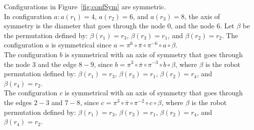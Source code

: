 \begin{example}
\label{ex:confSym}
Configurations in Figure~\ref{fig:confSym} are symmetric.\\
In configuration $a: a(r_1)=4$, $a(r_2)=6$, and $a(r_3)=8$, the axis of symmetry is the diameter that 
goes through the node $0$, and the node $6$. 
Let $\beta$ be the permutation defined by: $\beta(r_1) = r_3$, $\beta(r_3)=r_1$, and $\beta(r_2)=r_2$. 
The configuration $a$ is symmetrical since $a= \pi^6 \circ \overline{\pi} \circ \pi^{-6} \circ a \circ \beta$.\\
The configuration $b$ is symmetrical with an axis of symmetry that goes through the node $3$ and the edge $8-9$,
since $b = \pi^3 \circ \overline{\pi} \circ \pi^{-3} \circ b \circ \beta$, where $\beta$ is the robot permutation
defined by: $\beta(r_1)=r_3$, $\beta(r_3)=r_1$, $\beta(r_2)=r_4$, and $\beta(r_4)=r_2$.\\
The configuration $c$ is symmetrical with an axis of symmetry that goes through the edges $2-3$ and $7-8$, 
since $c = \pi^3 \circ \overline{\pi} \circ \pi^{-2} \circ c \circ \beta$, where $\beta$ is the robot permutation
defined by: $\beta(r_1)=r_3$, $\beta(r_3)=r_1$, $\beta(r_2)=r_4$, and $\beta(r_4)=r_2$.\\
\begin{figure} %
\centering
{}
\end{figure}
\end{example}
